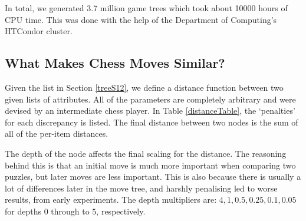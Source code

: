 In total, we generated 3.7 million game trees which took about 10000 hours of
CPU time. This was done with the help of the Department of Computing's HTCondor
cluster.

\subsection{What Makes Chess Moves Similar?}\label{treeS13}

Given the list in Section \ref{treeS12}, we define a distance function
between two given lists of attributes. All of the parameters are completely
arbitrary and were devised by an intermediate chess player. In Table
\ref{distanceTable}, the `penalties' for each discrepancy is listed. The final
distance between two nodes is the sum of all of the per-item distances.

The depth of the node affects the final scaling for the distance. The reasoning
behind this is that an initial move is much more important when comparing two
puzzles, but later moves are less important. This is also because there is
usually a lot of differences later in the move tree, and harshly penalising led
to worse results, from early experiments. The depth multipliers are: $4, 1,
0.5, 0.25, 0.1, 0.05$ for depths $0$ through to $5$, respectively.

